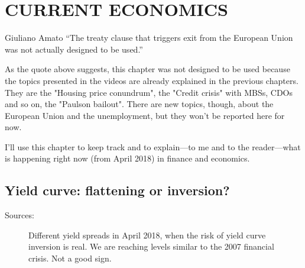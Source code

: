 \chapter{CURRENT ECONOMICS}
\begin{chapquote}{Giuliano Amato}
``The treaty clause that triggers exit from the European Union was not actually designed to be used.''
\end{chapquote}

As the quote above suggests, this chapter was not designed to be used because the topics presented in the videos are already explained in the previous chapters. They are the "Housing price conundrum", the "Credit crisis" with MBSs, CDOs and so on, the "Paulson bailout". There are new topics, though, about the European Union and the unemployment, but they won't be reported here for now.

I'll use this chapter to keep track and to explain---to me and to the reader---what is happening right now (from April 2018) in finance and economics.

\section{Yield curve: flattening or inversion?}
Sources: \citep{yield_inversion}

\hspace*{-1cm}
\begin{figure}
    \caption{Different yield spreads in April 2018, when the risk of yield curve inversion is real. We are reaching levels similar to the 2007 financial crisis. Not a good sign.}
    \label{fig:flattening_yields}
\end{figure}
\hspace*{-1cm}

